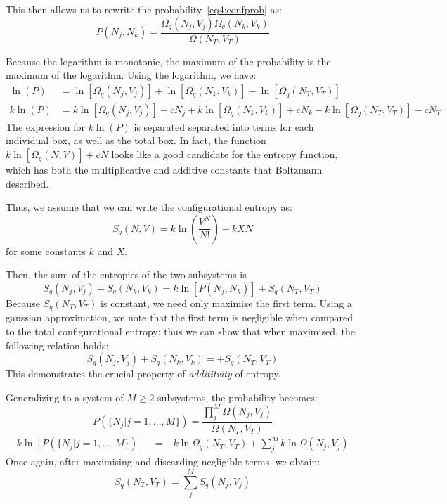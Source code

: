 This then allows us to rewrite the probability~\ref{eq4:confprob} as:
\begin{equation}
	P(N_j, N_k)=\frac{\Omega_q(N_j, V_j)\Omega_q(N_k, V_k)}{\Omega(N_T,V_T)}\label{eq4:omegaprob}
\end{equation}

Because the logarithm is monotonic, the maximum of the probability is the maximum of the logarithm. Using the logarithm, we have:
\begin{align}
	\ln(P)&=\ln[\Omega_q(N_j,V_j)]+\ln[\Omega_q(N_k,V_k)]-\ln[\Omega_q(N_T,V_T)]\nonumber\\
	k\ln(P)&=k\ln[\Omega_q(N_j,V_j)]+cN_j+k\ln[\Omega_q(N_k,V_k)]+cN_k-k\ln[\Omega_q(N_T,V_T)]-cN_T\nonumber
\end{align}
The expression for \(k\ln(P)\) is separated  separated into terms for each individual box, as well as the total box. In fact, the function \(k\ln[\Omega_q(N,V)]+cN\) looks like a good candidate for the entropy function, which has both the multiplicative and additive constants that Boltzmann described.

Thus, we assume that we can write the configurational entropy as:
\begin{equation}
	S_q(N,V)=k\ln \left(\frac{V^N}{N!}\right)+k X N
\end{equation}
for some constants \(k\) and \(X\). 

Then, the sum of the entropies of the two subsystems is
\[	S_q(N_j, V_j)+S_q(N_k, V_k) =k\ln[P(N_j, N_k)]+S_q(N_T, V_T)\]
Because \(S_q(N_T, V_T)\) is constant, we need only maximize the first term. Using a gaussian approximation, we note that the first term is negligible when compared to the total configurational entropy; thus we can show that when maximised, the following relation holds:
\begin{equation}
	S_q(N_j, V_j)+S_q(N_k, V_k) =+S_q(N_T, V_T)
\end{equation}
This demonstrates the crucial property of \emph{addititvity} of entropy.

Generalizing to a system of \(M\geq 2\) subsystems, the probability becomes:
\[P(\{N_j|j=1,\ldots,M\})=\frac{\prod_j^M\Omega(N_j, V_j)}{\Omega(N_T, V_T)}\]
\begin{align}
	k\ln [P(\{N_j|j=1,\ldots,M\})]&=-k\ln\Omega_q(N_T, V_T)+\sum_j^M k\ln\Omega(N_j, V_j)
\end{align}
Once again, after maximising and discarding negligible terms, we obtain:
\begin{equation}
	S_q(N_T, V_T) = \sum_j^M S_q(N_j, V_j)
\end{equation}

